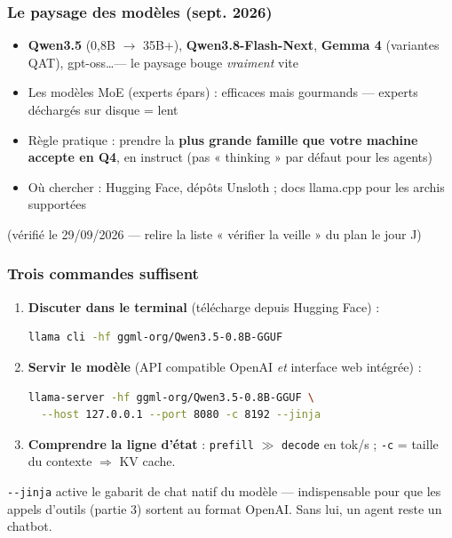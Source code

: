 \documentclass[
	11pt,
	aspectratio=169
]{beamer}
\begin{document}
\begin{frame}
    \frametitle{Le paysage des modèles (sept. 2026)}
    \begin{itemize}\setlength\itemsep{0.5em}
        \item \textbf{Qwen3.5} (0{,}8B $\rightarrow$ 35B+), \textbf{Qwen3.8-Flash-Next}, \textbf{Gemma 4} (variantes QAT), gpt-oss\dots --- le paysage bouge \emph{vraiment} vite
        \item Les modèles MoE (experts épars) : efficaces mais gourmands --- experts déchargés sur disque = lent
        \item Règle pratique : prendre la \textbf{plus grande famille que votre machine accepte en Q4}, en instruct (pas « thinking » par défaut pour les agents)
        \item Où chercher : Hugging Face, dépôts Unsloth ; docs llama.cpp pour les archis supportées
    \end{itemize}
    \vfill
    \small (vérifié le 29/09/2026 --- relire la liste « vérifier la veille » du plan le jour J)
\end{frame}

\begin{frame}[fragile]
    \frametitle{Trois commandes suffisent}
    \begin{enumerate}
        \item \textbf{Discuter dans le terminal} (télécharge depuis Hugging Face) :
\begin{lstlisting}[language=bash]
llama cli -hf ggml-org/Qwen3.5-0.8B-GGUF
\end{lstlisting}
        \item \textbf{Servir le modèle} (API compatible OpenAI \emph{et} interface web intégrée) :
\begin{lstlisting}[language=bash]
llama-server -hf ggml-org/Qwen3.5-0.8B-GGUF \
  --host 127.0.0.1 --port 8080 -c 8192 --jinja
\end{lstlisting}
        \item \textbf{Comprendre la ligne d'état} : \texttt{prefill} $\gg$ \texttt{decode} en tok/s ; \texttt{-c} = taille du contexte $\Rightarrow$ KV cache.
    \end{enumerate}
    \vfill
    \begin{alertblock}{}
        \texttt{-\/-jinja} active le gabarit de chat natif du modèle --- indispensable pour que les appels d'outils (partie 3) sortent au format OpenAI. Sans lui, un agent reste un chatbot.
    \end{alertblock}
\end{frame}
\end{document}
